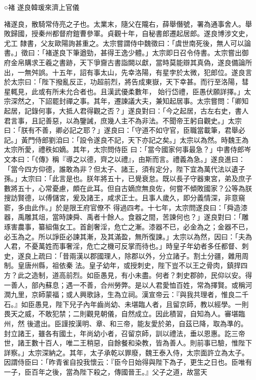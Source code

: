 
\begin{pinyinscope}

 ○褚
 遂良韓瑗來濟上官儀



 褚遂良，散騎常侍亮之子也。太業末，隨父在隴右，薛舉僭號，署為通事舍人。舉敗歸國，授秦州都督府鎧曹參軍。貞觀十年，自秘書郎遷起居郎。遂良博涉文史，尤工
 隸書，父友歐陽詢甚重之。太宗嘗謂侍中魏徵曰：「虞世南死後，無人可以論書。」徵曰：「褚遂良下筆遒勁，甚得王逸少體。」太宗即日召令侍書。太宗嘗出御府金帛購求王羲之書跡，天下爭齎古書詣闕以獻，當時莫能辯其真偽，遂良備論所出，一無舛誤。十五年，詔有事太山，先幸洛陽，有星孛於太微，犯郎位。遂良言於太宗曰：「陛下撥亂反正，功超前烈，將告成東嶽，天下幸甚。而行至洛陽，彗星輒見，此或有所未允合者也。且漢武優柔數年，
 始行岱禮，臣愚伏願詳擇。」太宗深然之，下詔罷封禪之事。其年，遷諫議大夫，兼知起居事。太宗嘗問：「卿知起居，記錄何事，大抵人君得觀之否？」遂良對曰：「今之起居，古左右史，書人君言事，且記善惡，以為鑒誡，庶幾人主不為非法。不聞帝王躬自觀史。」太宗曰：「朕有不善，卿必記之耶？」遂良曰：「守道不如守官，臣職當載筆，君舉必記。」黃門侍郎劉洎曰：「設令遂良不記，天下亦記之矣。」太宗以為然。時魏王為太宗所愛，禮秩如嫡。其年，太宗問侍臣
 曰：「當今國家何事最急？」中書侍郎岑文本曰：「《傳》稱『導之以德，齊之以禮』，由斯而言。禮義為急。」遂良進曰：「當今四方仰德，誰敢為非？但太子、諸王，須有定分，陛下宜為萬代法以遺子孫。」太宗曰：「此言是也。朕年將五十，已覺衰怠。既以長子守器東宮，弟及庶子數將五十，心常憂慮，頗在此耳。但自古嫡庶無良佐，何嘗不傾敗國家？公等為朕搜訪賢德，以傅儲宮，爰及諸王，咸求正士。且事人歲久，即分義情深，非意窺窬，多由此作。」於是限王府官僚不
 得過四考。十七年，太宗問遂良曰：「舜造漆器，禹雕其俎，當時諫舜、禹者十餘人。食器之間，苦諫何也？」遂良對曰：「雕琢害農事，纂組傷女工。首創奢淫，危亡之漸。漆器不已，必金為之；金器不已，必玉為之。所以諍臣必諫其漸，及其滿盈，無所復諫。」太宗以為然，因曰：「夫為人君，不憂萬姓而事奢淫，危亡之機可反掌而待也。」時皇子年幼者多任都督、刺史，遂良上疏曰：「昔兩漢以郡國理人，除郡以外，分立諸子。割土分疆，雜用周制。皇唐州縣，祖依秦
 法。皇子幼年，或授刺史，陛下豈不以王之骨肉，鎮捍四方？此之造制，道高前烈。如臣愚見，有小未盡。何者？刺史郡帥，民仰以安。得一善人，部內蘇息；遇一不善，合州勞弊。是以人君愛恤百姓，常為擇賢。或稱河潤九里，京師蒙福；或人興歌詠，生為立祠。漢宣帝云：『與我共理者，惟良二千石。』如臣愚見，陛下兒子內年齒尚幼、未堪臨人者，且留京師，教以經學。一則畏天之威，不敢犯禁；二則觀見朝儀，自然成立。因此積習，自知為人。審堪臨州，然
 後遣出。臣謹按漢明、章、和三帝，能友愛於弟，自茲已降，取為準的。封立諸王，雖各有國土，年尚幼小者，召留京師，訓以禮法，垂以恩惠。訖三帝世，諸王數十百人，唯二王稍惡，自餘餐和染教，皆為善人。則前事已驗，惟陛下詳察。」太宗深納之。其年，太子承乾以罪廢，魏王泰入侍，太宗面許立為太子。因謂侍臣曰：「昨青雀自投我懷云：『臣今日始得與陛下為子，更生之日也。臣唯有一子，臣百年之後，當為陛下殺之，傳國晉王。』父子之道，故當天

\end{pinyinscope}
